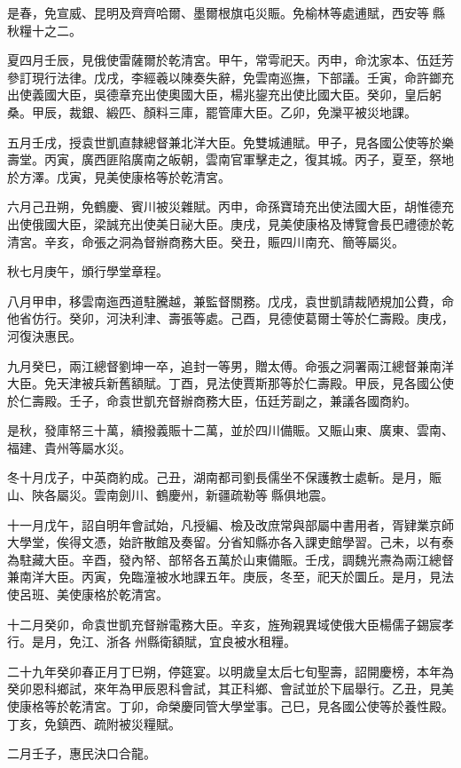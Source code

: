 \begin{pinyinscope}
是春，免宣威、昆明及齊齊哈爾、墨爾根旗屯災賑。免榆林等處逋賦，西安等縣秋糧十之二。

夏四月壬辰，見俄使雷薩爾於乾清宮。甲午，常雩祀天。丙申，命沈家本、伍廷芳參訂現行法律。戊戌，李經羲以陳奏失辭，免雲南巡撫，下部議。壬寅，命許鎯充出使義國大臣，吳德章充出使奧國大臣，楊兆鋆充出使比國大臣。癸卯，皇后躬桑。甲辰，裁銀、緞匹、顏料三庫，罷管庫大臣。乙卯，免灤平被災地課。

五月壬戌，授袁世凱直隸總督兼北洋大臣。免雙城逋賦。甲子，見各國公使等於樂壽堂。丙寅，廣西匪陷廣南之皈朝，雲南官軍擊走之，復其城。丙子，夏至，祭地於方澤。戊寅，見美使康格等於乾清宮。

六月己丑朔，免鶴慶、賓川被災雜賦。丙申，命孫寶琦充出使法國大臣，胡惟德充出使俄國大臣，梁誠充出使美日祕大臣。庚戌，見美使康格及博覽會長巴禮德於乾清宮。辛亥，命張之洞為督辦商務大臣。癸丑，賑四川南充、簡等屬災。

秋七月庚午，頒行學堂章程。

八月甲申，移雲南迤西道駐騰越，兼監督關務。戊戌，袁世凱請裁陋規加公費，命他省仿行。癸卯，河決利津、壽張等處。己酉，見德使葛爾士等於仁壽殿。庚戌，河復決惠民。

九月癸巳，兩江總督劉坤一卒，追封一等男，贈太傅。命張之洞署兩江總督兼南洋大臣。免天津被兵新舊額賦。丁酉，見法使賈斯那等於仁壽殿。甲辰，見各國公使於仁壽殿。壬子，命袁世凱充督辦商務大臣，伍廷芳副之，兼議各國商約。

是秋，發庫帑三十萬，續撥義賑十二萬，並於四川備賑。又賑山東、廣東、雲南、福建、貴州等屬水災。

冬十月戊子，中英商約成。己丑，湖南都司劉長儒坐不保護教士處斬。是月，賑山、陜各屬災。雲南劍川、鶴慶州，新疆疏勒等縣俱地震。

十一月戊午，詔自明年會試始，凡授編、檢及改庶常與部屬中書用者，胥肄業京師大學堂，俟得文憑，始許散館及奏留。分省知縣亦各入課吏館學習。己未，以有泰為駐藏大臣。辛酉，發內帑、部帑各五萬於山東備賑。壬戌，調魏光燾為兩江總督兼南洋大臣。丙寅，免臨潼被水地課五年。庚辰，冬至，祀天於圜丘。是月，見法使呂班、美使康格於乾清宮。

十二月癸卯，命袁世凱充督辦電務大臣。辛亥，旌殉親異域使俄大臣楊儒子錫宸孝行。是月，免江、浙各州縣衛額賦，宜良被水租糧。

二十九年癸卯春正月丁巳朔，停筵宴。以明歲皇太后七旬聖壽，詔開慶榜，本年為癸卯恩科鄉試，來年為甲辰恩科會試，其正科鄉、會試並於下屆舉行。乙丑，見美使康格等於乾清宮。丁卯，命榮慶同管大學堂事。己巳，見各國公使等於養性殿。丁亥，免鎮西、疏附被災糧賦。

二月壬子，惠民決口合龍。


\end{pinyinscope}
